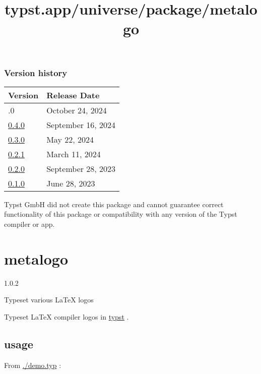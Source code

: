 \subsubsection{Version history}\label{version-history}

\begin{longtable}[]{@{}ll@{}}
\toprule\noalign{}
Version & Release Date \\
\midrule\noalign{}
\endhead
\bottomrule\noalign{}
\endlastfoot
0.5.0 & October 24, 2024 \\
\href{https://typst.app/universe/package/quill/0.4.0/}{0.4.0} &
September 16, 2024 \\
\href{https://typst.app/universe/package/quill/0.3.0/}{0.3.0} & May 22,
2024 \\
\href{https://typst.app/universe/package/quill/0.2.1/}{0.2.1} & March
11, 2024 \\
\href{https://typst.app/universe/package/quill/0.2.0/}{0.2.0} &
September 28, 2023 \\
\href{https://typst.app/universe/package/quill/0.1.0/}{0.1.0} & June 28,
2023 \\
\end{longtable}

Typst GmbH did not create this package and cannot guarantee correct
functionality of this package or compatibility with any version of the
Typst compiler or app.


\title{typst.app/universe/package/metalogo}

\label{banner}
\section{metalogo}\label{metalogo}

{ 1.0.2 }

Typeset various LaTeX logos

\label{readme}
Typeset LaTeX compiler logos in
\href{https://github.com/typst/typst}{typst} .

\subsection{usage}\label{usage}

From
\href{https://github.com/typst/packages/raw/main/packages/preview/metalogo/1.0.2/demo.typ}{./demo.typ}
:

\begin{Shaded}
\begin{Highlighting}[]


\end{Highlighting}
\end{Shaded}

